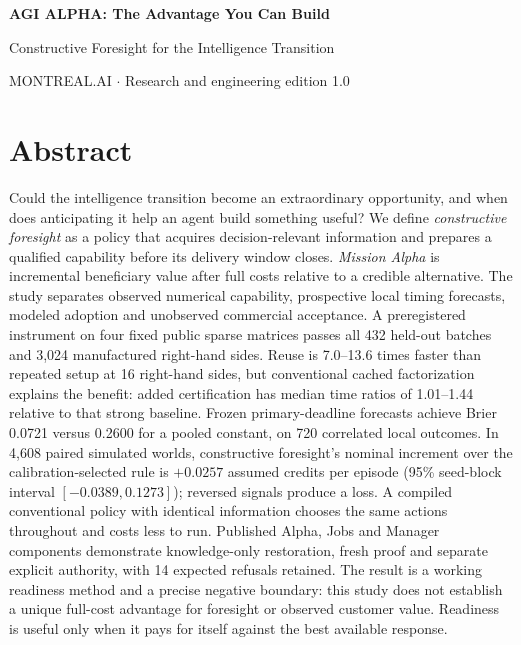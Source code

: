 \documentclass[11pt,a4paper]{article}
\newcommand{\PrimaryBrier}{0.0721}
\newcommand{\BaseBrier}{0.2600}
\begin{document}
\begin{center}
{\Large\sffamily\bfseries AGI ALPHA: The Advantage You Can Build}\par
\vspace{3pt}
{\large Constructive Foresight for the Intelligence Transition}\par
\vspace{6pt}
MONTREAL.AI \quad $\cdot$ \quad Research and engineering edition 1.0
\end{center}
\section*{Abstract}
Could the intelligence transition become an extraordinary opportunity, and when does anticipating it help an agent build something useful? We define \emph{constructive foresight} as a policy that acquires decision-relevant information and prepares a qualified capability before its delivery window closes. \emph{Mission Alpha} is incremental beneficiary value after full costs relative to a credible alternative. The study separates observed numerical capability, prospective local timing forecasts, modeled adoption and unobserved commercial acceptance. A preregistered instrument on four fixed public sparse matrices passes all 432 held-out batches and 3,024 manufactured right-hand sides. Reuse is 7.0--13.6 times faster than repeated setup at 16 right-hand sides, but conventional cached factorization explains the benefit: added certification has median time ratios of 1.01--1.44 relative to that strong baseline. Frozen primary-deadline forecasts achieve Brier \PrimaryBrier{} versus \BaseBrier{} for a pooled constant, on 720 correlated local outcomes. In 4,608 paired simulated worlds, constructive foresight's nominal increment over the calibration-selected rule is $+0.0257$ assumed credits per episode (95\% seed-block interval $[-0.0389,0.1273]$); reversed signals produce a loss. A compiled conventional policy with identical information chooses the same actions throughout and costs less to run. Published Alpha, Jobs and Manager components demonstrate knowledge-only restoration, fresh proof and separate explicit authority, with 14 expected refusals retained. The result is a working readiness method and a precise negative boundary: this study does not establish a unique full-cost advantage for foresight or observed customer value. Readiness is useful only when it pays for itself against the best available response.
\end{document}
